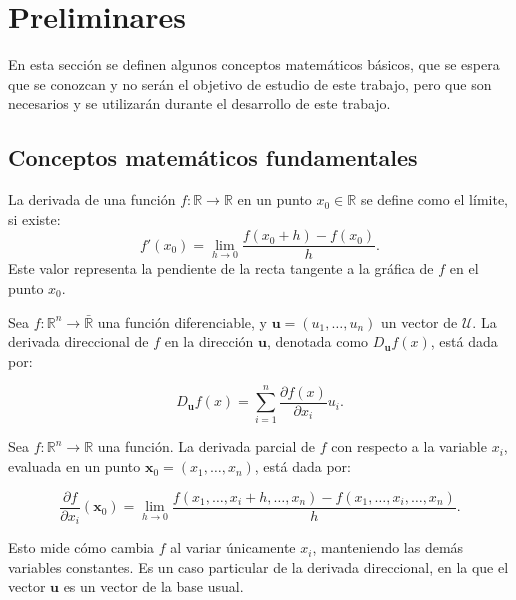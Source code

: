 
\chapter{Preliminares}

En esta sección se definen algunos conceptos matemáticos básicos, que se espera que se conozcan y no serán el objetivo de estudio de este trabajo, pero que son necesarios y se utilizarán durante el desarrollo de este trabajo.

\section{Conceptos matemáticos fundamentales}

\begin{definicion}[Derivada]
\label{def:derivada}
La derivada de una función $f: \mathbb{R} \to \mathbb{R}$ en un punto $x_0 \in \mathbb{R}$ se define como el límite, si existe:
\[
f'(x_0) = \lim_{h \to 0} \frac{f(x_0 + h) - f(x_0)}{h}.
\]
Este valor representa la pendiente de la recta tangente a la gráfica de $f$ en el punto $x_0$.
\end{definicion}

\begin{definicion}
\label{def:derivada_direccional}
Sea $f : \mathbb{R}^n \to \bar{\mathbb{R}}$ una función diferenciable, y $\mathbf{u} = (u_1, \dots, u_n)$ un vector de $\mathcal{U}$. La derivada direccional de $f$ en la dirección $\mathbf{u}$, denotada como $D_{\mathbf{u}} f(x)$, está dada por:

\[
D_{\mathbf{u}} f(x) = \sum_{i=1}^n \frac{\partial f(x)}{\partial x_i} u_i.
\]
\end{definicion}

\begin{definicion}
\label{def:derivada_parcial}
Sea $f : \mathbb{R}^n \to \mathbb{R}$ una función. La derivada parcial de $f$ con respecto a la variable $x_i$, evaluada en un punto $\mathbf{x}_0 = (x_1, \dots, x_n)$, está dada por:

\[
\frac{\partial f}{\partial x_i}(\mathbf{x}_0) = \lim_{h \to 0} \frac{f(x_1, \dots, x_i + h, \dots, x_n) - f(x_1, \dots, x_i, \dots, x_n)}{h}.
\]

Esto mide cómo cambia $f$ al variar únicamente $x_i$, manteniendo las demás variables constantes. Es un caso particular de la derivada direccional, en la que el vector $\mathbf{u}$ es un vector de la base usual.
\end{definicion}

